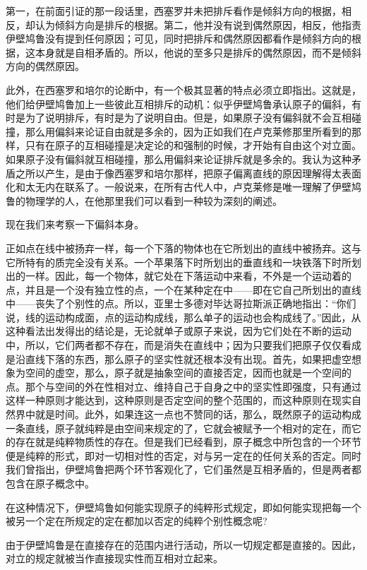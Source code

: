 \documentclass[a4paper,twoside,12pt]{ctexart}
\begin{document}
 第一，在前面引证的那一段话里，西塞罗并未把排斥看作是倾斜方向的根据，相反，却认为倾斜方向是排斥的根据。第二，他并没有说到偶然原因，相反，他指责伊壁鸠鲁没有提到任何原因；可见，同时把排斥和偶然原因都看作是倾斜方向的根据，这本身就是自相矛盾的。所以，他说的至多只是排斥的偶然原因，而不是倾斜方向的偶然原因。

此外，在西塞罗和培尔的论断中，有一个极其显著的特点必须立即指出。这就是，他们给伊壁鸠鲁加上一些彼此互相排斥的动机：似乎伊壁鸠鲁承认原子的偏斜，有时是为了说明排斥，有时是为了说明自由。但是，如果原子没有偏斜就不会互相碰撞，那么用偏斜来论证自由就是多余的，因为正如我们在卢克莱修那里所看到的那样，只有在原子的互相碰撞是决定论的和强制的时候，才开始有自由这个对立面。如果原子没有偏斜就互相碰撞，那么用偏斜来论证排斥就是多余的。我认为这种矛盾之所以产生，是由于像西塞罗和培尔那样，把原子偏离直线的原因理解得太表面化和太无内在联系了。一般说来，在所有古代人中，卢克莱修是唯一理解了伊壁鸠鲁的物理学的人，在他那里我们可以看到一种较为深刻的阐述。

现在我们来考察一下偏斜本身。

正如点在线中被扬弃一样，每一个下落的物体也在它所划出的直线中被扬弃。这与它所特有的质完全没有关系。一个苹果落下时所划出的垂直线和一块铁落下时所划出的一样。因此，每一个物体，就它处在下落运动中来看，不外是一个运动着的点，并且是一个没有独立性的点，一个在某种定在中——即在它自己所划出的直线中——丧失了个别性的点。所以，亚里士多德对毕达哥拉斯派正确地指出：“你们说，线的运动构成面，点的运动构成线，那么单子的运动也会构成线了。”因此，从这种看法出发得出的结论是，无论就单子或原子来说，因为它们处在不断的运动中，所以，它们两者都不存在，而是消失在直线中；因为只要我们把原子仅仅看成是沿直线下落的东西，那么原子的坚实性就还根本没有出现。首先，如果把虚空想象为空间的虚空，那么，原子就是抽象空间的直接否定，因而也就是一个空间的点。那个与空间的外在性相对立、维持自己于自身之中的坚实性即强度，只有通过这样一种原则才能达到，这种原则是否定空间的整个范围的，而这种原则在现实自然界中就是时间。此外，如果连这一点也不赞同的话，那么，既然原子的运动构成一条直线，原子就纯粹是由空间来规定的了，它就会被赋予一个相对的定在，而它的存在就是纯粹物质性的存在。但是我们已经看到，原子概念中所包含的一个环节便是纯粹的形式，即对一切相对性的否定，对与另一定在的任何关系的否定。同时我们曾指出，伊壁鸠鲁把两个环节客观化了，它们虽然是互相矛盾的，但是两者都包含在原子概念中。

在这种情况下，伊壁鸠鲁如何能实现原子的纯粹形式规定，即如何能实现把每一个被另一个定在所规定的定在都加以否定的纯粹个别性概念呢?

由于伊壁鸠鲁是在直接存在的范围内进行活动，所以一切规定都是直接的。因此，对立的规定就被当作直接现实性而互相对立起来。
\end{document}
